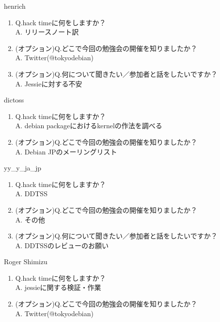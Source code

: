 \begin{prework}{ henrich }
  \begin{enumerate}
  \item Q.hack timeに何をしますか？\\
    A. リリースノート訳
  \item (オプション)Q.どこで今回の勉強会の開催を知りましたか？\\
    A. Twitter(@tokyodebian)
  \item (オプション)Q.何について聞きたい／参加者と話をしたいですか？\\
    A. Jessieに対する不安
  \end{enumerate}
\end{prework}

\begin{prework}{ dictoss }
  \begin{enumerate}
  \item Q.hack timeに何をしますか？\\
    A. debian packageにおけるkernelの作法を調べる
  \item (オプション)Q.どこで今回の勉強会の開催を知りましたか？\\
    A. Debian JPのメーリングリスト
  \end{enumerate}
\end{prework}

\begin{prework}{ yy\_y\_ja\_jp }
  \begin{enumerate}
  \item Q.hack timeに何をしますか？\\
    A. DDTSS 
  \item (オプション)Q.どこで今回の勉強会の開催を知りましたか？\\
    A. その他
  \item (オプション)Q.何について聞きたい／参加者と話をしたいですか？\\
    A. DDTSSのレビューのお願い
  \end{enumerate}
\end{prework}

\begin{prework}{ Roger Shimizu }
  \begin{enumerate}
  \item Q.hack timeに何をしますか？\\
    A. jessieに関する検証・作業
  \item (オプション)Q.どこで今回の勉強会の開催を知りましたか？\\
    A. Twitter(@tokyodebian)
  \end{enumerate}
\end{prework}
